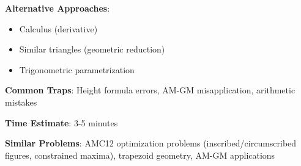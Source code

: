 \documentclass[12pt]{article}
\begin{document}
\textbf{Alternative Approaches}: 
\begin{itemize}
    \item Calculus (derivative)
    \item Similar triangles (geometric reduction)
    \item Trigonometric parametrization
\end{itemize}

\textbf{Common Traps}: Height formula errors, AM-GM misapplication, arithmetic mistakes

\textbf{Time Estimate}: 3-5 minutes

\textbf{Similar Problems}: AMC12 optimization problems (inscribed/circumscribed figures, constrained maxima), trapezoid geometry, AM-GM applications
\end{document}
